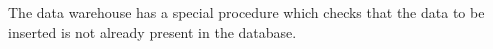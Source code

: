 The data warehouse has a special procedure which checks that the data to be inserted is not already present in the database.

